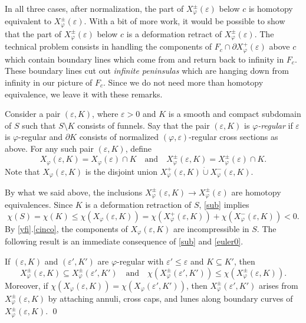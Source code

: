 In all three cases, after normalization,
the part of $X_{\varphi}^\pm({\varepsilon})$ below $c$ is homotopy equivalent to $X_{\varphi}^\pm({\varepsilon})$.
With a bit of more work, it would be possible to show that the part of $X_{\varphi}^\pm({\varepsilon})$
below $c$ is a deformation retract of $X_{\varphi}^\pm({\varepsilon})$.
The technical problem consists in handling the components of $F_c\cap \partial X_{\varphi}^+({\varepsilon})$
above $c$ which contain boundary lines which come from and return back to infinity in $F_c$.
These boundary lines cut out \emph{infinite peninsulas} which are hanging down from infinity
in our picture of $F_c$.
Since we do not need more than homotopy equivalence, we leave it with these remarks.

Consider a pair $({\varepsilon},K)$,
where ${\varepsilon}>0$ and $K$ is a smooth and compact subdomain of $S$
such that $S\setminus K$ consists of funnels.
Say that the pair $({\varepsilon},K)$ is \emph{${\varphi}$-regular} if ${\varepsilon}$ is ${\varphi}$-regular
and $\partial K$ consists of normalized $({\varphi},{\varepsilon})$-regular cross sections as above.
For any such pair $({\varepsilon},K)$, define
\begin{equation}\label{xvek}
  X_{\varphi}({\varepsilon},K) = X_{\varphi}({\varepsilon}) \cap K
  \quad\text{and}\quad
  X_{\varphi}^\pm({\varepsilon},K) = X_{\varphi}^\pm({\varepsilon}) \cap K.
\end{equation}
Note that $X_{\varphi}({\varepsilon},K)$ is the disjoint union $X_{\varphi}^+({\varepsilon},K)\dot\cup X_{\varphi}^-({\varepsilon},K)$.

By what we said above,
the inclusions $X_{\varphi}^\pm({\varepsilon},K)\to X_{\varphi}^\pm({\varepsilon})$ are homotopy equivalences.
Since $K$ is a deformation retraction of $S$,
 \cref{sub} implies
\begin{equation}\label{eular}
  \chi(S) = \chi(K) \le \chi(X_{\varphi}({\varepsilon},K)) = \chi(X_{\varphi}^+({\varepsilon},K)) + \chi(X_{\varphi}^-({\varepsilon},K)) < 0.
\end{equation}
By \cref{yfi}.\ref{cinco},
the components of $X_{\varphi}({\varepsilon},K)$ are incompressible in $S$.
The following result is an immediate consequence of \cref{sub} and \cref{euler0}.

\begin{lem}\label{euler}
If $({\varepsilon},K)$ and $({\varepsilon}',K')$ are ${\varphi}$-regular with ${\varepsilon}'\le{\varepsilon}$ and $K\subseteq K'$, then
\begin{equation*}
  X_{\varphi}^\pm({\varepsilon},K)\subseteq X_{\varphi}^\pm({\varepsilon}',K')
  \quad\text{and}\quad
  \chi(X_{\varphi}^\pm({\varepsilon}',K'))\le\chi(X_{\varphi}^\pm({\varepsilon},K)).
\end{equation*}
Moreover, if $\chi(X_{\varphi}({\varepsilon},K)) = \chi(X_{\varphi}({\varepsilon}',K'))$,
then $X_{\varphi}^\pm({\varepsilon}',K')$ arises from $X_{\varphi}^\pm({\varepsilon},K)$
by attaching annuli, cross caps, and lunes
along boundary curves of $X_{\varphi}^\pm({\varepsilon},K)$. \qed
\end{lem}

